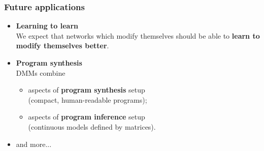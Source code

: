 \documentclass{beamer}
\newcommand{\msmagenta}[1]{{\color{mymagenta} #1}}
\begin{document}
\begin{frame}

  \frametitle{Future applications}

\begin{itemize} 

\item \msmagenta{{\bf Learning to learn}}\\[2ex]

We expect that networks which modify themselves should be able to {\bf learn to modify themselves better}.\\[2ex]

\item \msmagenta{{\bf Program synthesis}}\\[2ex]

DMMs combine\\

\begin{itemize}

\item aspects of {\bf program synthesis} setup\\ (compact, human-readable programs);\\

\item aspects of {\bf program inference} setup\\ (continuous models defined by matrices).

\end{itemize} 

\item \msmagenta{and more...}
\end{itemize}

\end{frame}
\end{document}
